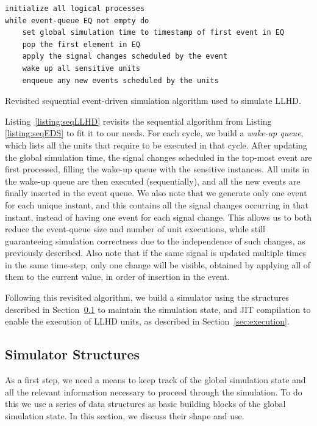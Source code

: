 \begin{listing}[ht]
    \begin{verbatim}
initialize all logical processes
while event-queue EQ not empty do
    set global simulation time to timestamp of first event in EQ
    pop the first element in EQ
    apply the signal changes scheduled by the event
    wake up all sensitive units
    enqueue any new events scheduled by the units
    \end{verbatim}
    \caption{Revisited sequential event-driven simulation algorithm used to simulate LLHD.}
    \label{listing:seqLLHD}
\end{listing}

Listing~\ref{listing:seqLLHD} revisits the sequential algorithm from Listing \ref{listing:seqEDS} to fit it to our needs. For each cycle, we build a \textit{wake-up queue}, which lists all the units that require to be executed in that cycle. After updating the global simulation time, the signal changes scheduled in the top-most event are first processed, filling the wake-up queue with the sensitive instances. All units in the wake-up queue are then executed (sequentially), and all the new events are finally inserted in the event queue. We also note that we generate only one event for each unique instant, and this contains all the signal changes occurring in that instant, instead of having one event for each signal change. This allows us to both reduce the event-queue size and number of unit executions, while still guaranteeing simulation correctness due to the independence of such changes, as previously described. Also note that if the same signal is updated multiple times in the same time-step, only one change will be visible, obtained by applying all of them to the current value, in order of insertion in the event.

Following this revisited algorithm, we build a simulator using the structures described in Section~\ref{sec:structs} to maintain the simulation state, and JIT compilation to enable the execution of LLHD units, as described in Section~\ref{sec:execution}.


\subsection{Simulator Structures}
\label{sec:structs}
As a first step, we need a means to keep track of the global simulation state and all the relevant information necessary to proceed through the simulation. To do this we use a series of data structures as basic building blocks of the global simulation state. In this section, we discuss their shape and use.

